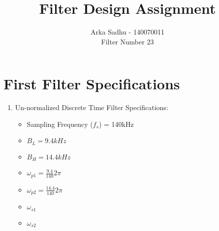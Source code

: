 \documentclass[22pt]{article}
\title{ \huge{\textbf{Filter Design Assignment}}}
\author{
  Arka Sadhu - 140070011\\
  Filter Number 23
}
\begin{document}
\maketitle

\tableofcontents
\newpage
\section{First Filter Specifications}
\begin{enumerate}
\item Un-normalized Discrete Time Filter Specifications:
  \begin{itemize}
  \item Sampling Frequency ($f_s$) = 140kHz
  \item $B_L = 9.4 kHz$
  \item $B_H = 14.4 kHz$
  \item $\omega_{p1} = \frac{9.4}{140}2\pi$
  \item $\omega_{p2} = \frac{14.4}{140}2\pi$
  \item $\omega_{s1}$
  \item $\omega_{s2}$
  \end{itemize}
\end{enumerate}
\end{document}
